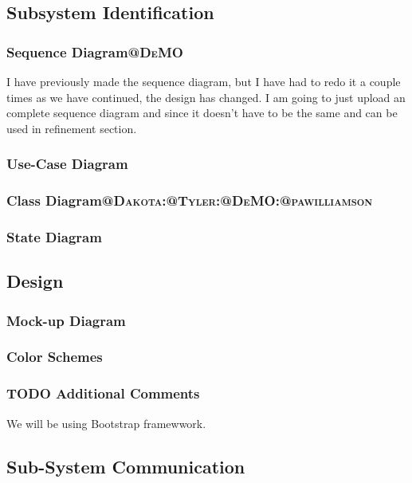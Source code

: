 \documentclass[11pt]{article}
\begin{document}
\subsection{Subsystem Identification}
\label{sec:org9f8e945}
\subsubsection{Sequence Diagram\hfill{}\textsc{@DeMO}}
\label{sec:org474874a}
I have previously made the sequence diagram, but I have had to redo it a couple times
as we have continued, the design has changed. I am going to just upload an complete 
sequence diagram and since it doesn't have to be the same and can be used in refinement
section.
\subsubsection{Use-Case Diagram}
\label{sec:org0dc7b17}

\subsubsection{Class Diagram\hfill{}\textsc{@Dakota:@Tyler:@DeMO:@pawilliamson}}
\label{sec:org779b03e}

\subsubsection{State Diagram}
\label{sec:org916ef68}
\subsection{Design}
\label{sec:org5080350}
\subsubsection{Mock-up Diagram}
\label{sec:orgc8e6978}
\subsubsection{Color Schemes}
\label{sec:orgd4f23f7}
\subsubsection{{\bfseries\sffamily TODO} Additional Comments}
\label{sec:orgd1a30d5}
We will be using Bootstrap framewwork.
\subsection{Sub-System Communication}
\label{sec:org3d5c8d8}
\end{document}
